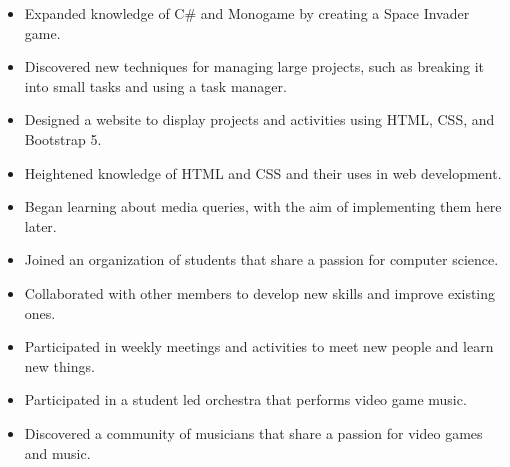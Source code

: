 \documentclass[10pt,a4paper,ragged2e,withhyper]{altacv}
\begin{document}
\begin{paracol}{2}
\begin{itemize}
  \item Expanded knowledge of C\# and Monogame by creating a Space Invader game.
  \item Discovered new techniques for managing large projects, such as breaking it into small tasks and using a task manager.
\end{itemize}

\divider

\begin{itemize}
  \item Designed a website to display projects and activities using HTML, CSS, and Bootstrap 5.
  \item Heightened knowledge of HTML and CSS and their uses in web development.
  \item Began learning about media queries, with the aim of implementing them here later.
\end{itemize}

\switchcolumn


\divider


\medskip

\begin{itemize}
  \item Joined an organization of students that share a passion for computer science.
  \item Collaborated with other members to develop new skills and improve existing ones.
  \item Participated in weekly meetings and activities to meet new people and learn new things.
\end{itemize}

\divider

\begin{itemize}
  \item Participated in a student led orchestra that performs video game music.
  \item Discovered a community of musicians that share a passion for video games and music.
\end{itemize}


\end{paracol}
\end{document}
